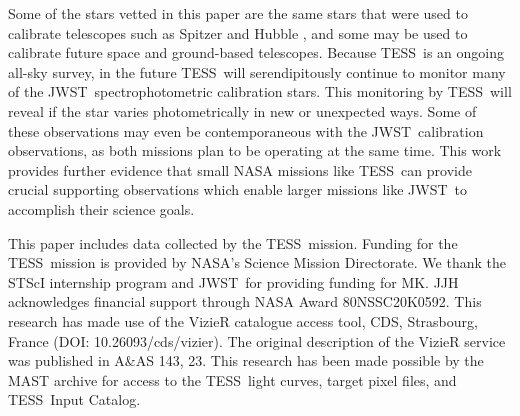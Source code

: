 \documentclass[twocolumn, linenumbers]{aastex631}
\newcommand{\webb}{JWST}
\newcommand{\jwst}{JWST}
\newcommand{\tess}{TESS}
\begin{document}
Some of the stars vetted in this paper are the same stars that were used to calibrate telescopes such as Spitzer \citep{Reach2005} and Hubble \citep{Bohlin2011AJ}, and some may be used to calibrate future space and ground-based telescopes.  Because \tess\ is an ongoing all-sky survey, in the future \tess\ will serendipitously continue to monitor many of the \webb\ spectrophotometric calibration stars. This monitoring by \tess\ will reveal if the star varies photometrically in new or unexpected ways.  Some of these observations may even be contemporaneous with the \webb\ calibration observations, as both missions plan to be operating at the same time.  This work provides further evidence that small NASA missions like \tess\ can provide crucial supporting observations which enable larger missions like \jwst\ to accomplish their science goals.

\begin{acknowledgments}
This paper includes data collected by the \tess\ mission. Funding for the \tess\ mission is provided by NASA's Science Mission Directorate. We thank the STScI internship program and \jwst\ for providing funding for MK. JJH acknowledges financial support through NASA Award 80NSSC20K0592. This research has made use of the VizieR catalogue access tool, CDS, Strasbourg, France (DOI: 10.26093/cds/vizier). The original description of the VizieR service was published in A\&AS 143, 23. This research has been made possible by the MAST archive for access to the \tess\ light curves, target pixel files, and \tess\ Input Catalog.
\end{acknowledgments}

\vspace{5mm}


{}

\end{document}
